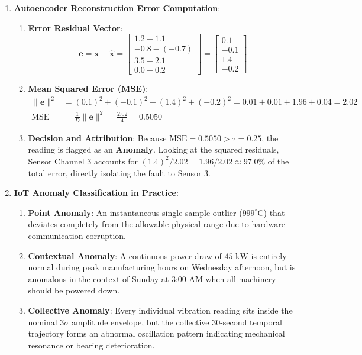\begin{enumerate}
    \item \textbf{Autoencoder Reconstruction Error Computation}:
    \begin{enumerate}[label=(\alph*)]
        \item \textbf{Error Residual Vector}:
        \begin{equation*}
        \mathbf{e} = \mathbf{x} - \hat{\mathbf{x}} = \begin{bmatrix} 1.2 - 1.1 \\ -0.8 - (-0.7) \\ 3.5 - 2.1 \\ 0.0 - 0.2 \end{bmatrix} = \begin{bmatrix} 0.1 \\ -0.1 \\ 1.4 \\ -0.2 \end{bmatrix}
        \end{equation*}

        \item \textbf{Mean Squared Error (MSE)}:
        \begin{align*}
        \|\mathbf{e}\|^2 &= (0.1)^2 + (-0.1)^2 + (1.4)^2 + (-0.2)^2 = 0.01 + 0.01 + 1.96 + 0.04 = \mathbf{2.02} \\
        \text{MSE} &= \frac{1}{D} \|\mathbf{e}\|^2 = \frac{2.02}{4} = \mathbf{0.5050}
        \end{align*}

        \item \textbf{Decision and Attribution}:
        Because $\text{MSE} = 0.5050 > \tau = 0.25$, the reading is flagged as an \textbf{Anomaly}. Looking at the squared residuals, Sensor Channel 3 accounts for $(1.4)^2 / 2.02 = 1.96 / 2.02 \approx \mathbf{97.0\%}$ of the total error, directly isolating the fault to Sensor 3.
    \end{enumerate}

    \item \textbf{IoT Anomaly Classification in Practice}:
    \begin{enumerate}[label=(\alph*)]
        \item \textbf{Point Anomaly}: An instantaneous single-sample outlier ($999^\circ\text{C}$) that deviates completely from the allowable physical range due to hardware communication corruption.
        \item \textbf{Contextual Anomaly}: A continuous power draw of $45\text{ kW}$ is entirely normal during peak manufacturing hours on Wednesday afternoon, but is anomalous in the context of Sunday at 3:00 AM when all machinery should be powered down.
        \item \textbf{Collective Anomaly}: Every individual vibration reading sits inside the nominal $3\sigma$ amplitude envelope, but the collective 30-second temporal trajectory forms an abnormal oscillation pattern indicating mechanical resonance or bearing deterioration.
    \end{enumerate}
\end{enumerate}
